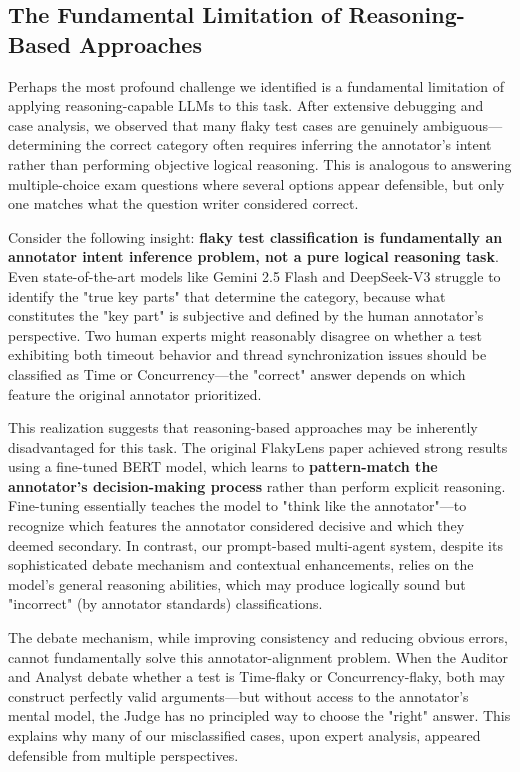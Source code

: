 \documentclass{article}
\begin{document}
\subsection{The Fundamental Limitation of Reasoning-Based Approaches}

Perhaps the most profound challenge we identified is a fundamental limitation of applying reasoning-capable LLMs to this task. After extensive debugging and case analysis, we observed that many flaky test cases are genuinely ambiguous—determining the correct category often requires inferring the annotator's intent rather than performing objective logical reasoning. This is analogous to answering multiple-choice exam questions where several options appear defensible, but only one matches what the question writer considered correct.

Consider the following insight: \textbf{flaky test classification is fundamentally an annotator intent inference problem, not a pure logical reasoning task}. Even state-of-the-art models like Gemini 2.5 Flash and DeepSeek-V3 struggle to identify the "true key parts" that determine the category, because what constitutes the "key part" is subjective and defined by the human annotator's perspective. Two human experts might reasonably disagree on whether a test exhibiting both timeout behavior and thread synchronization issues should be classified as Time or Concurrency—the "correct" answer depends on which feature the original annotator prioritized.

This realization suggests that reasoning-based approaches may be inherently disadvantaged for this task. The original FlakyLens paper achieved strong results using a fine-tuned BERT model, which learns to \textbf{pattern-match the annotator's decision-making process} rather than perform explicit reasoning. Fine-tuning essentially teaches the model to "think like the annotator"—to recognize which features the annotator considered decisive and which they deemed secondary. In contrast, our prompt-based multi-agent system, despite its sophisticated debate mechanism and contextual enhancements, relies on the model's general reasoning abilities, which may produce logically sound but "incorrect" (by annotator standards) classifications.

The debate mechanism, while improving consistency and reducing obvious errors, cannot fundamentally solve this annotator-alignment problem. When the Auditor and Analyst debate whether a test is Time-flaky or Concurrency-flaky, both may construct perfectly valid arguments—but without access to the annotator's mental model, the Judge has no principled way to choose the "right" answer. This explains why many of our misclassified cases, upon expert analysis, appeared defensible from multiple perspectives.
\end{document}
